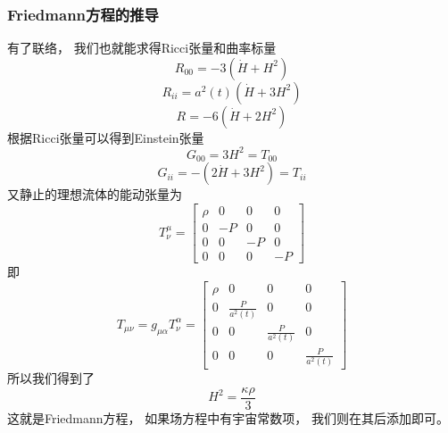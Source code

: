 \documentclass[8pt]{beamer}
\begin{document}
        \begin{frame}[fragile]
            \frametitle{Friedmann方程的推导}
            \begin{multicols}{2}
                \qquad   
                有了联络，
                我们也就能求得Ricci张量和曲率标量
                $$R_{00}=-3(\dot{H}+H^2)$$
                $$R_{ii}=a^2(t)(\dot{H}+3H^2)$$
                $$R=-6(\dot{H}+2H^2)$$
                根据Ricci张量可以得到Einstein张量
                $$G_{00}=3H^2=T_{00}$$
                $$G_{ii}=-(2\dot{H}+3H^2)=T_{ii}$$
                又静止的理想流体的能动张量为
                $$T^{\mu}_{\nu}=
                \begin{bmatrix}
                    \rho & 0 & 0 & 0\\
                    0 & -P& 0 & 0\\
                    0 & 0 & -P& 0\\
                    0 & 0 & 0 & -P
                \end{bmatrix}
                $$
                即
                $$T_{\mu\nu}=g_{\mu\alpha}T^{\alpha}_{\nu}=
                \begin{bmatrix}
                    \rho & 0 & 0 & 0\\
                    0 & \frac{P}{a^2(t)}& 0 & 0\\
                    0 & 0 & \frac{P}{a^2(t)}& 0\\
                    0 & 0 & 0 & \frac{P}{a^2(t)}
                \end{bmatrix}
                $$
                所以我们得到了$$H^2=\frac{\kappa\rho}{3}$$
                这就是Friedmann方程，
                如果场方程中有宇宙常数项，
                我们则在其后添加即可。
            \end{multicols}
        \end{frame}

    




\tiny

\scriptsize

\footnotesize

\small

\normalsize

\large

\Large

\huge

\Huge
\end{document}
